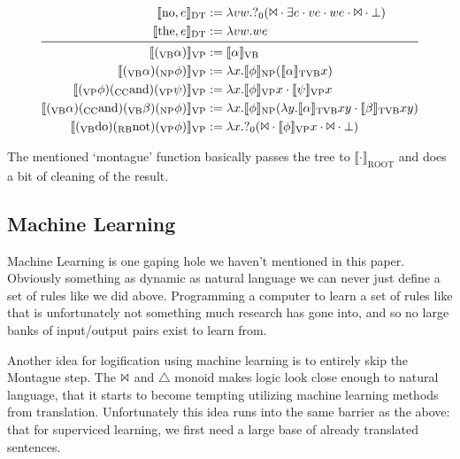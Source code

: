 \documentclass[12pt]{article}
\begin{document}
\begin{equation*}
\begin{aligned}
\llbracket \text{no}, e\rrbracket_\text{DT} &:= \lambda vw.?_0(\Bowtie\cdot\exists e\cdot ve\cdot we\cdot\Bowtie\cdot\bot)\\
\llbracket \text{the}, e\rrbracket_\text{DT} &:= \lambda vw.we\\
\midrule\ 
%
\llbracket (_\text{VB}\alpha)\rrbracket_\text{VP} &:= \llbracket \alpha\rrbracket_\text{VB}\\
\llbracket (_\text{VB}\alpha)(_\text{NP}\phi)\rrbracket_\text{VP} &:= \lambda x.\llbracket \phi\rrbracket_\text{NP} (\llbracket \alpha\rrbracket_\text{TVB} x)\\
\llbracket (_\text{VP}\phi)(_\text{CC}\text{and})(_\text{VP}\psi)\rrbracket_\text{VP} &:= \lambda x.\llbracket \phi\rrbracket_\text{VP}x\cdot \llbracket \psi\rrbracket_\text{VP}x\\
\llbracket (_\text{VB}\alpha)(_\text{CC}\text{and})(_\text{VB}\beta)(_\text{NP}\phi)\rrbracket_\text{VP} &:= \lambda x.\llbracket \phi\rrbracket_\text{NP}(\lambda y.\llbracket \alpha\rrbracket_\text{TVB}xy\cdot \llbracket \beta\rrbracket_\text{TVB}xy)\\
\llbracket (_\text{VB}\text{do})(_\text{RB}\text{not})(_\text{VP}\phi)\rrbracket_\text{VP} &:= \lambda x.?_0(\Bowtie\cdot\llbracket \phi\rrbracket_\text{VP}x\cdot\Bowtie\cdot\bot)
\end{aligned}\end{equation*}

The mentioned `montague' function basically passes the tree to $\llbracket\cdot\rrbracket_\text{ROOT}$ and does a bit of cleaning of the result.

\subsection{Machine Learning}

Machine Learning is one gaping hole we haven't mentioned in this paper. Obviously something as dynamic as natural language we can never just define a set of rules like we did above. Programming a computer to learn a set of rules like that is unfortunately not something much research has gone into, and so no large banks of input/output pairs exist to learn from.

Another idea for logification using machine learning is to entirely skip the Montague step. The $\Bowtie$ and $\triangle$ monoid makes logic look close enough to natural language, that it starts to become tempting utilizing machine learning methods from translation. Unfortunately this idea runs into the same barrier as the above: that for superviced learning, we first need a large base of already translated sentences.
\end{document}
